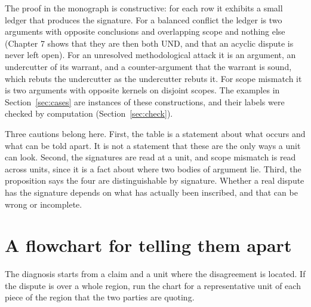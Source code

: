 \documentclass[11pt]{article}
\newcommand{\UND}{\textsf{UND}}
\begin{document}
The proof in the monograph is constructive: for each row it exhibits a small ledger that produces the signature. For a balanced conflict the ledger is two arguments with opposite conclusions and overlapping scope and nothing else (Chapter 7 shows that they are then both \UND{}, and that an acyclic dispute is never left open). For an unresolved methodological attack it is an argument, an undercutter of its warrant, and a counter-argument that the warrant is sound, which rebuts the undercutter as the undercutter rebuts it. For scope mismatch it is two arguments with opposite kernels on disjoint scopes. The examples in Section~\ref{sec:cases} are instances of these constructions, and their labels were checked by computation (Section~\ref{sec:check}).

Three cautions belong here. First, the table is a statement about what occurs and what can be told apart. It is not a statement that these are the only ways a unit can look. Second, the signatures are read at a unit, and scope mismatch is read across units, since it is a fact about where two bodies of argument lie. Third, the proposition says the four are distinguishable by signature. Whether a real dispute has the signature depends on what has actually been inscribed, and that can be wrong or incomplete.

\section{A flowchart for telling them apart}\label{sec:flow}

The diagnosis starts from a claim and a unit where the disagreement is located. If the dispute is over a whole region, run the chart for a representative unit of each piece of the region that the two parties are quoting.
\end{document}
